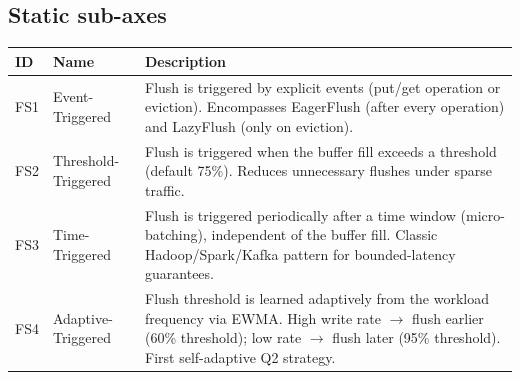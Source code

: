 \subsection*{Static sub-axes}
\begin{scriptsize}
\begin{longtable}{@{}>{\raggedright\arraybackslash}p{1.8cm} >{\raggedright\arraybackslash}p{3.2cm} >{\raggedright\arraybackslash}p{8.5cm}@{}}
\toprule
ID & Name & Description \\
\midrule
\endhead%
FS1 & Event-Triggered & Flush is triggered by explicit events (put/\allowbreak{}get operation or eviction). Encompasses Eager\allowbreak{}Flush (after every operation) and Lazy\allowbreak{}Flush (only on eviction). \\
FS2 & Threshold-Triggered & Flush is triggered when the buffer fill exceeds a threshold (default 75\%). Reduces unnecessary flushes under sparse traffic. \\
FS3 & Time-Triggered & Flush is triggered periodically after a time window (micro-batching), independent of the buffer fill. Classic Hadoop/\allowbreak{}Spark/\allowbreak{}Kafka pattern for bounded-latency guarantees. \\
FS4 & Adaptive-Triggered & Flush threshold is learned adaptively from the workload frequency via EWMA\@. High write rate $\rightarrow$ flush earlier (60\% threshold); low rate $\rightarrow$ flush later (95\% threshold). First self-adaptive Q2 strategy. \\
\bottomrule
\end{longtable}
\end{scriptsize}

